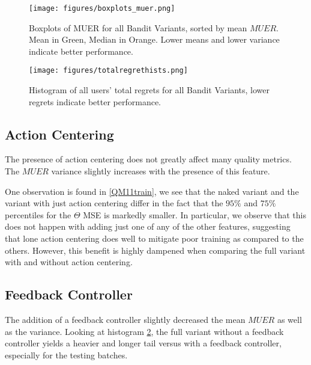 \begin{figure}[H]
\texttt{[image: figures/boxplots\_muer.png]}%
\caption{Boxplots of MUER for all Bandit Variants, sorted by mean $MUER$.  Mean in Green, Median in Orange.  Lower means and lower variance indicate better performance.}
\label{Boxplots of MUER for all Bandit Variants, sorted by mean MUER}
\end{figure}



\begin{figure}[H]
\texttt{[image: figures/totalregrethists.png]}%
\caption{Histogram of all users' total regrets for all Bandit Variants, lower regrets indicate better performance.}
\label{Histogram of all Users' Total Regrets for all Bandit Variants}
\end{figure}

\clearpage



\subsection{Action Centering}

The presence of action centering does not greatly affect many quality metrics.  The $MUER$ variance slightly increases with the presence of this feature.

One observation is found in \ref{QM11train}, we see that the naked variant and the variant with just action centering differ in the fact that the $95\%$ and $75\%$ percentiles for the $\Theta$ MSE is markedly smaller.  In particular, we observe that this does not happen with adding just one of any of the other features, suggesting that lone action centering does well to mitigate poor training as compared to the others.  However, this benefit is highly dampened when comparing the full variant with and without action centering.


\subsection{Feedback Controller}

The addition of a feedback controller slightly decreased the mean $MUER$ as well as the variance.  Looking at histogram \ref{Histogram of all Users' Total Regrets for all Bandit Variants}, the full variant without a feedback controller yields a heavier and longer tail versus with a feedback controller, especially for the testing batches.

